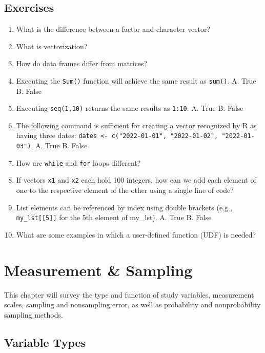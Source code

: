 \documentclass[]{book}
\begin{document}
\hypertarget{exercises}{%
\section{Exercises}\label{exercises}}

\begin{enumerate}
\def\labelenumi{\arabic{enumi}.}
\item
  What is the difference between a factor and character vector?
\item
  What is vectorization?
\item
  How do data frames differ from matrices?
\item
  Executing the \texttt{Sum()} function will achieve the same result as \texttt{sum()}.
  A. True
  B. False
\item
  Executing \texttt{seq(1,10)} returns the same results as \texttt{1:10}.
  A. True
  B. False
\item
  The following command is sufficient for creating a vector recognized by R as having three dates: \texttt{dates\ \textless{}-\ c("2022-01-01",\ "2022-01-02",\ "2022-01-03")}.
  A. True
  B. False
\item
  How are \texttt{while} and \texttt{for} loops different?
\item
  If vectors \texttt{x1} and \texttt{x2} each hold 100 integers, how can we add each element of one to the respective element of the other using a single line of code?
\item
  List elements can be referenced by index using double brackets (e.g., \texttt{my\_lst{[}{[}5{]}{]}} for the 5th element of my\_lst).
  A. True
  B. False
\item
  What are some examples in which a user-defined function (UDF) is needed?
\end{enumerate}

\hypertarget{measure-sampl}{%
\chapter{Measurement \& Sampling}\label{measure-sampl}}

This chapter will survey the type and function of study variables, measurement scales, sampling and nonsampling error, as well as probability and nonprobability sampling methods.

\hypertarget{variable-types}{%
\section{Variable Types}\label{variable-types}}
\end{document}
